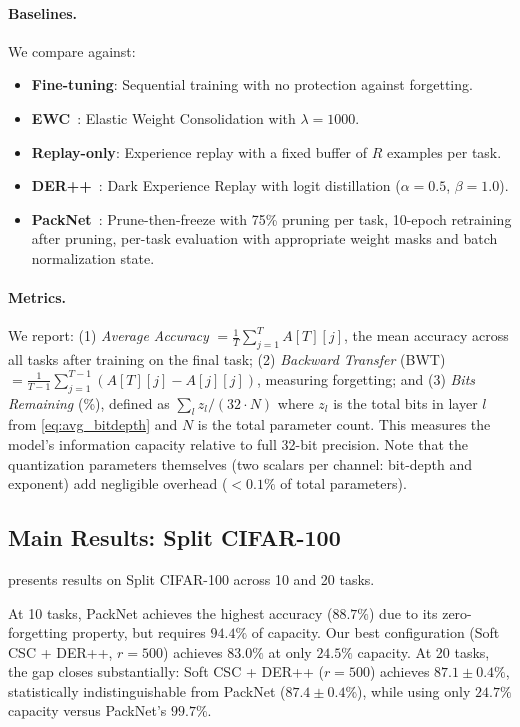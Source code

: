 \documentclass[11pt]{article}
\begin{document}
\paragraph{Baselines.}
We compare against:
\begin{itemize}
    \item \textbf{Fine-tuning}: Sequential training with no protection against forgetting.
    \item \textbf{EWC}~\citep{kirkpatrick2017overcoming}: Elastic Weight Consolidation with $\lambda = 1000$.
    \item \textbf{Replay-only}: Experience replay with a fixed buffer of $R$ examples per task.
    \item \textbf{DER++}~\citep{buzzega2020dark}: Dark Experience Replay with logit distillation ($\alpha = 0.5$, $\beta = 1.0$).
    \item \textbf{PackNet}~\citep{mallya2018packnet}: Prune-then-freeze with 75\% pruning per task, 10-epoch retraining after pruning, per-task evaluation with appropriate weight masks and batch normalization state.
\end{itemize}

\paragraph{Metrics.}
We report: (1) \textit{Average Accuracy} $= \frac{1}{T}\sum_{j=1}^T A[T][j]$, the mean accuracy across all tasks after training on the final task; (2) \textit{Backward Transfer} (BWT) $= \frac{1}{T-1}\sum_{j=1}^{T-1}(A[T][j] - A[j][j])$, measuring forgetting; and (3) \textit{Bits Remaining} (\%), defined as $\sum_l z_l / (32 \cdot N)$ where $z_l$ is the total bits in layer $l$ from \cref{eq:avg_bitdepth} and $N$ is the total parameter count.
This measures the model's information capacity relative to full 32-bit precision.
Note that the quantization parameters themselves (two scalars per channel: bit-depth and exponent) add negligible overhead ($< 0.1\%$ of total parameters).

\subsection{Main Results: Split CIFAR-100}

 presents results on Split CIFAR-100 across 10 and 20 tasks.



At 10 tasks, PackNet achieves the highest accuracy ($88.7\%$) due to its zero-forgetting property, but requires $94.4\%$ of capacity.
Our best configuration (Soft CSC + DER++, $r=500$) achieves $83.0\%$ at only $24.5\%$ capacity.
At 20 tasks, the gap closes substantially: Soft CSC + DER++ ($r=500$) achieves $87.1 \pm 0.4\%$, statistically indistinguishable from PackNet ($87.4 \pm 0.4\%$), while using only $24.7\%$ capacity versus PackNet's $99.7\%$.
\end{document}

